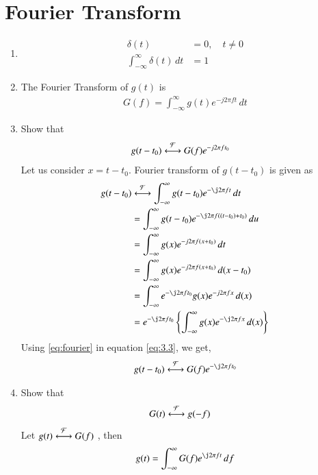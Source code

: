 \documentclass[journal,12pt,twocolumn]{IEEEtran}
\renewcommand\thesection{\arabic{section}}
\begin{document}
	\section{Fourier Transform}
	\begin{enumerate}[label=\thesection.\arabic*
		,ref=\thesection.\theenumi]
		\item 
		\begin{align}
			\delta(t)&=0, \quad t\neq 0 \\
			\int_{-\infty}^{\infty}\delta(t) \, dt&= 1
		\end{align}
		\item The Fourier Transform of $g(t)$ is
		\begin{align}
			G(f)=\int_{-\infty}^{\infty}g(t)e^{-j2\pi ft}\,dt
			\label{eq:fourier}
		\end{align}
		\item Show that 
		\begin{align}
			g(t-t_0)&\overset{\mathcal{F}}{ \longleftrightarrow}G(f)e^{-j2\pi ft_0}
			\label{eq:t-shift}
		\end{align}
		\solution Let us consider $x=t-t_0$. Fourier transform of $g(t-t_0)$ is given as
		\begin{align}
			g(t-t_0)&\system{F}\int_{-\infty}^{\infty}
			g(t-t_0)e^{-\j2\pi ft}\,dt \\
			&=\int_{-\infty}^{\infty}
			g(t-t_0)e^{-\j2\pi f((t-t_0) + t_0)}\,du \\
			&=\int_{-\infty}^{\infty}
			g(x)e^{-j2\pi f(x+t_0)}\,dt\\
			&=\int_{-\infty}^{\infty}
			g(x)e^{-j2\pi f(x+t_0)}\,d(x-t_0)\\
			&=\int_{-\infty}^{\infty}
			e^{-\j2\pi f t_0}g(x)e^{-j2\pi fx}\,d(x)\\
			\label{eq:3.3}
			&=e^{-\j2\pi f t_0} \cbrak{\int_{-\infty}^{\infty}
				g(x)e^{-\j2\pi fx}\,d(x)}
		\end{align}
		Using \eqref{eq:fourier} in equation \eqref{eq:3.3}, we get,
		\begin{align}
			\label{eq:3.3.1}
			g(t-t_0)\system{F}G(f)e^{-\j2\pi ft_0}
		\end{align}
		\item Show that
		\begin{align}
			\label{eq:inverse}
			G(t)&\overset{\mathcal{F}}{ \longleftrightarrow}g(-f)
		\end{align}
		\solution 
		Let $g(t)\overset{\mathcal{F}}{ \longleftrightarrow}G(f)$ , then 
		\begin{align}
			\label{eq:inverseFourier}
			g(t)=\int_{-\infty}^{\infty}G(f)e^{\j2\pi ft}\,df
		\end{align}

\end{enumerate}
\end{document}
